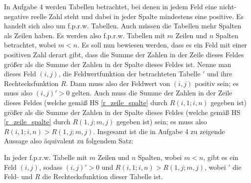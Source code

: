 In Aufgabe 4 werden Tabellen betrachtet, bei denen in jedem Feld eine nicht-negative reelle Zahl steht und dabei in 
jeder Spalte mindestens eine positive. Es handelt sich also um f.p.r.w. Tabellen. Auch müssen die Tabellen mehr 
Spalten als Zeilen haben. Es werden also f.p.r.w. Tabellen mit $m$ Zeilen und $n$ Spalten betrachtet, wobei $m<n$. 
Es soll nun bewiesen werden, dass es ein Feld mit einer positiven Zahl derart gibt, dass die Summe der Zahlen in der 
Zeile dieses Feldes größer als die Summe der Zahlen in der Spalte dieses Feldes ist. Nenne man dieses Feld $(i, j)$, 
die Feldwertfunktion der betrachteten Tabelle $'$ und ihre Rechtecksfunktion $R$. Dann muss also der Feldwert von $(i, j)$ 
positiv sein; es muss also $(i, j)'>0$ gelten. Auch muss die Summe der Zahlen in der Zeile dieses Feldes (welche 
gemäß HS \ref{r_zeile_spalte} durch $R(i, 1; i, n)$ gegeben ist) größer als die Summe der Zahlen in der Spalte 
dieses Feldes (welche gemäß HS \ref{r_zeile_spalte} durch $R(1, j; m, j)$ gegeben ist) sein; es muss also 
$R(i, 1; i, n) > R(1, j; m, j)$. Insgesamt ist die in Aufgabe 4 zu zeigende Aussage also äquivalent zu folgendem 
Satz:

\begin{thm}\label{haupt4}
    In jeder f.p.r.w. Tabelle mit $m$ Zeilen und $n$ Spalten, wobei $m<n$, gibt es ein Feld $(i, j)$, sodass 
    $(i, j)'>0$ und $R(i, 1; i, n) > R(1, j; m, j)$, wobei $'$ die Feld- und $R$ die Rechtecksfunktion dieser 
    Tabelle ist.
\end{thm}

